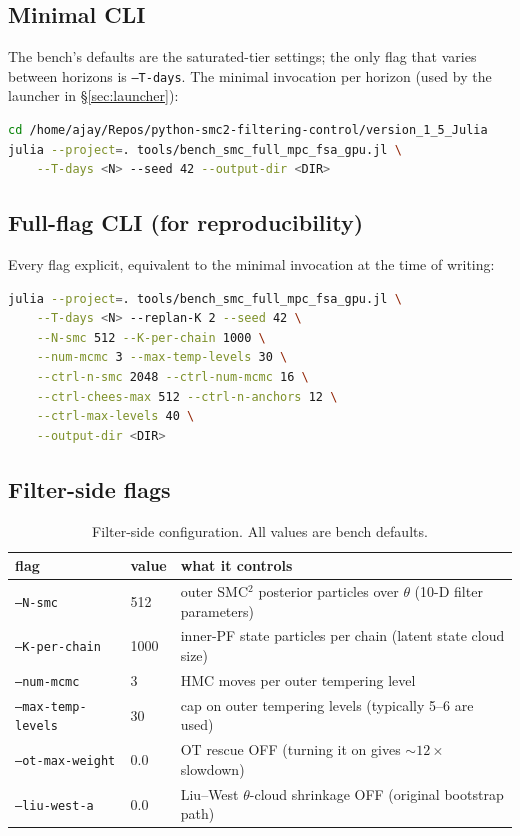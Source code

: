 \documentclass[11pt,a4paper]{article}
\begin{document}
\subsection{Minimal CLI}

The bench's defaults are the saturated-tier settings; the only flag
that varies between horizons is \texttt{--T-days}. The minimal
invocation per horizon (used by the launcher in
\S\ref{sec:launcher}):

\begin{lstlisting}[language=bash]
cd /home/ajay/Repos/python-smc2-filtering-control/version_1_5_Julia
julia --project=. tools/bench_smc_full_mpc_fsa_gpu.jl \
    --T-days <N> --seed 42 --output-dir <DIR>
\end{lstlisting}

\subsection{Full-flag CLI (for reproducibility)}

Every flag explicit, equivalent to the minimal invocation at the
time of writing:

\begin{lstlisting}[language=bash]
julia --project=. tools/bench_smc_full_mpc_fsa_gpu.jl \
    --T-days <N> --replan-K 2 --seed 42 \
    --N-smc 512 --K-per-chain 1000 \
    --num-mcmc 3 --max-temp-levels 30 \
    --ctrl-n-smc 2048 --ctrl-num-mcmc 16 \
    --ctrl-chees-max 512 --ctrl-n-anchors 12 \
    --ctrl-max-levels 40 \
    --output-dir <DIR>
\end{lstlisting}

\subsection{Filter-side flags}

\begin{table}[ht]
\centering
\small
\begin{tabular}{lll}
\toprule
flag & value & what it controls \\
\midrule
\texttt{--N-smc}              & 512   & outer SMC$^2$ posterior particles over $\theta$ (10-D filter parameters) \\
\texttt{--K-per-chain}        & 1000  & inner-PF state particles per chain (latent state cloud size) \\
\texttt{--num-mcmc}           & 3     & HMC moves per outer tempering level \\
\texttt{--max-temp-levels}    & 30    & cap on outer tempering levels (typically 5--6 are used) \\
\texttt{--ot-max-weight}      & 0.0   & OT rescue OFF (turning it on gives ${\sim}12\times$ slowdown) \\
\texttt{--liu-west-a}         & 0.0   & Liu--West $\theta$-cloud shrinkage OFF (original bootstrap path) \\
\bottomrule
\end{tabular}
\caption{Filter-side configuration. All values are bench defaults.}
\label{tab:filter_cfg}
\end{table}
\end{document}
